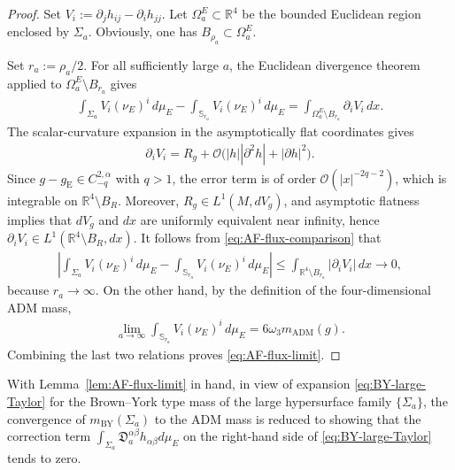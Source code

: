 \documentclass[10pt]{amsart}
\newcommand{\R}{\mathbb{R}}
\newcommand{\Sph}{\mathbb{S}}
\newcommand{\gE}{g_{\mathrm{E}}}
\newcommand{\ADM}{\mathrm{ADM}}
\newcommand{\BY}{\mathrm{BY}}
\theoremstyle{plain}
\theoremstyle{remark}
\begin{document}
	\begin{proof}
		Set $V_i:=\partial_jh_{ij}-\partial_ih_{jj}$. Let $\Omega_a^E\subset\R^4$ be the bounded Euclidean region enclosed by
		$\Sigma_a$. Obviously, one has $B_{\rho_a}\subset\Omega_a^E$.
		
		Set $r_a:=\rho_a/2$. For all sufficiently large $a$, the Euclidean
		divergence theorem applied to $\Omega_a^E\setminus B_{r_a}$ gives
		\begin{align}\label{eq:AF-flux-comparison}
			\int_{\Sigma_a}
			V_i(\nu_E)^i\,d\mu_E
			-
			\int_{\Sph_{r_a}}
			V_i(\nu_E)^i\,d\mu_E
			=
			\int_{\Omega_a^E\setminus B_{r_a}}
			\partial_iV_i\,dx .
		\end{align}
		The scalar-curvature expansion in the asymptotically flat coordinates
		gives
		\begin{align*}
			\partial_iV_i
			=
			R_g
			+
			\mathcal O\bigl(
			|h||\partial^2h|
			+
			|\partial h|^2
			\bigr).
		\end{align*}
		Since $g-\gE\in C^{2,\alpha}_{-q}$ with $q>1$, the error term is of order $\mathcal O(|x|^{-2q-2})$, which is integrable on $\R^4\setminus B_R$. Moreover,
		$R_g\in L^1(M,dV_g)$, and asymptotic flatness implies that $dV_g$ and $dx$ are uniformly equivalent near infinity, hence $\partial_iV_i \in L^1(\R^4\setminus B_R,dx)$. It follows from \eqref{eq:AF-flux-comparison} that
		\begin{align*}
			\left|
			\int_{\Sigma_a}
			V_i(\nu_E)^i\,d\mu_E
			-
			\int_{\Sph_{r_a}}
			V_i(\nu_E)^i\,d\mu_E
			\right|
			\leq
			\int_{\R^4\setminus B_{r_a}}
			|\partial_iV_i|\,dx
			\longrightarrow
			0,
		\end{align*}
		because $r_a\to\infty$. On the other hand, by the definition of the
		four-dimensional ADM mass,
		\begin{align*}
			\lim_{a\to\infty}
			\int_{\Sph_{r_a}}
			V_i(\nu_E)^i\,d\mu_E
			=
			6\omega_3m_{\ADM}(g).
		\end{align*}
		Combining the last two relations proves
		\eqref{eq:AF-flux-limit}.
	\end{proof}
	
	With Lemma~\ref{lem:AF-flux-limit} in hand, in view of expansion \eqref{eq:BY-large-Taylor} for the Brown--York type mass of the large hypersurface family $\{\Sigma_a\}$, the convergence of $m_{\BY}(\Sigma_a)$ to the ADM mass is reduced to
	showing that the correction term $\int_{\Sigma_a}
	\mathfrak D_a^{\alpha\beta}
	h_{\alpha\beta}d\mu_E$ on the right-hand side of \eqref{eq:BY-large-Taylor} tends to zero.
	
\end{document}
